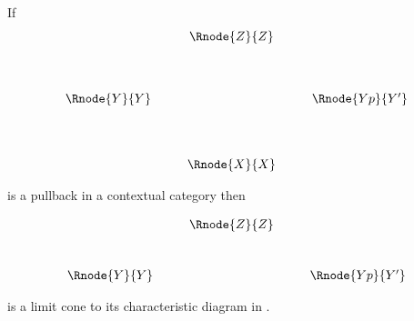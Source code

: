 \documentclass[10pt,a4paper]{scrartcl}
\newcommand{\ccatc}{contextual category \ccat}
\begin{document}
\begin{lemma}
If 
\begin{displaymath}
\begin{array}{cp{0.3cm}c    p{0.3cm}  c }
               & & \Rnode{Z}{Z} & &                                  \\ [1.3cm]
\Rnode{Y}{Y}   &&                               & & \Rnode{Yp}{Y'}   \\ [1.4cm]
               & & \Rnode{X}{X} & &   
\end{array}
\end{displaymath}

\noindent
is a pullback in a \ccatc 
then 
\begin{center}
\begin{equation}
\label{pbselflimitcone}
\begin{array}{cp{0.3cm}c    p{0.3cm}  c }
               & & \Rnode{Z}{Z} & &                                  \\ [1.0cm]
\Rnode{Y}{Y}   &&                               & & \Rnode{Yp}{Y'}  
\end{array}
\end{equation}
\end{center}
is a limit cone to its characteristic diagram in \ccat.
\end{lemma}
\end{document}
